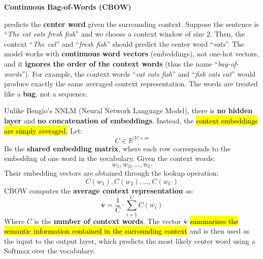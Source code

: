 \highspace
\begin{flushleft}
    \textcolor{Green3}{ \textbf{Continuous Bag-of-Words (CBOW)}}
\end{flushleft}
 predicts the \textbf{center word} given the surrounding context. Suppose the sentence is ``\emph{The cat eats fresh fish}'' and we choose a context window of size $2$. Then, the context ``\emph{The cat}'' and ``\emph{fresh fish}'' should predict the center word ``\emph{eats}''. The model works with \textbf{continuous word vectors} (embeddings), not one-hot vectors, and it \textbf{ignores the order of the context words} (thus the name ``\emph{bag-of-words}''). For example, the context words ``\emph{cat eats fish}'' and ``\emph{fish eats cat}'' would produce exactly the same averaged context representation. The words are treated like a \textbf{bag}, not a sequence.

\highspace
Unlike Bengio's NNLM (Neural Network Language Model), there is \textbf{no hidden layer} and \textbf{no concatenation of embeddings}. Instead, the \hl{context embeddings are simply averaged.} Let:
\begin{equation*}
    C \in \mathbb{R}^{\left|V\right| \times m}
\end{equation*}
Be the \textbf{shared embedding matrix}, where each row corresponds to the embedding of one word in the vocabulary. Given the context words:
\begin{equation*}
    w_1, w_2, \ldots, w_C
\end{equation*}
Their embedding vectors are obtained through the lookup operation:
\begin{equation*}
    C\left(w_1\right), C\left(w_2\right), \ldots, C\left(w_C\right)
\end{equation*}
CBOW computes the \textbf{average context representation} as:
\begin{equation}\label{eq:cbow-average-context}
    \bar{\mathbf{v}}
    =
    \frac{1}{C}
    \cdot
    \sum_{i=1}^{C}
    C\left(w_i\right)
\end{equation}
Where $C$ is the \textbf{number of context words}. The vector $\bar{\mathbf{v}}$ \hl{summarizes the semantic information contained in the surrounding context} and is then used as the input to the output layer, which predicts the most likely center word using a Softmax over the vocabulary.

